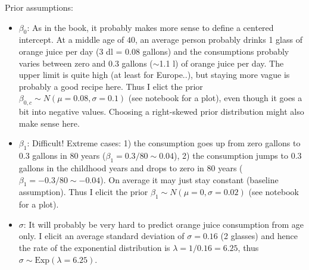 \documentclass[fontsize=11pt,DIV=18,parskip=half]{scrartcl}
\begin{document}
\begin{itemize}
Prior assumptions:
\begin{itemize}
\item $\beta_0$: As in the book, it probably makes more sense to define a centered intercept. At a middle age of $40$, an average person probably drinks 1 glass of orange juice per day (3 dl = 0.08 gallons) and the consumptions probably varies between zero and 0.3 gallons ($\sim$1.1 l) of orange juice per day. The upper limit is quite high (at least for Europe..), but staying more vague is probably a good recipe here. Thus I elict the prior $\beta_{0,c} \sim N(\mu=0.08, \sigma=0.1)$ (see notebook for a plot), even though it goes a bit into negative values. Choosing a right-skewed prior distribution might also make sense here.
\item $\beta_1$: Difficult! Extreme cases: 1) the consumption goes up from zero gallons to 0.3 gallons in 80 years ($\beta_1 = 0.3/80 \sim 0.04$), 2) the consumption jumps to 0.3 gallons in the childhood years and drops to zero in 80 years ($\beta_1 = -0.3/80 \sim -0.04$). On average it may just stay constant (baseline assumption). Thus I elicit the prior $\beta_1 \sim N(\mu=0, \sigma=0.02)$ (see notebook for a plot).
\item $\sigma$: It will probably be very hard to predict orange juice consumption from age only. I elicit an average standard deviation of $\sigma=0.16$ (2 glasses) and hence the rate of the exponential distribution is $\lambda = 1/0.16 = 6.25$, thus $\sigma \sim \text{Exp}(\lambda = 6.25)$.
\end{itemize}
\end{itemize}
\end{document}
